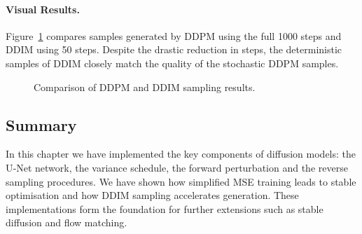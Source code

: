 \paragraph{Visual Results.}  Figure~\ref{fig:ddpmvsddim} compares
samples generated by DDPM using the full 1000 steps and DDIM using
50 steps.  Despite the drastic reduction in steps, the deterministic
samples of DDIM closely match the quality of the stochastic DDPM
samples.

\begin{figure}[H]
  \centering
  \hfill
  \caption{Comparison of DDPM and DDIM sampling results.}
  \label{fig:ddpmvsddim}
\end{figure}

\subsection{Summary}

In this chapter we have implemented the key components of diffusion
models: the U‑Net network, the variance schedule, the forward
perturbation and the reverse sampling procedures.  We have shown how
simplified MSE training leads to stable optimisation and how DDIM
sampling accelerates generation.  These implementations form the
foundation for further extensions such as stable diffusion and flow
matching.
